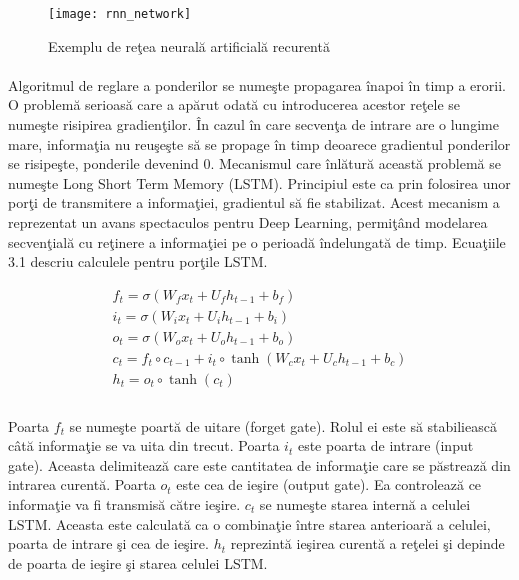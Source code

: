 \begin{figure}[H]
\centering
\texttt{[image: rnn\_network]}
\caption{Exemplu de re\c tea neural\u a artificial\u a recurent\u a}
\end{figure}

\paragraph{}
Algoritmul de reglare a ponderilor se nume\c ste propagarea \^ inapoi \^ in timp a erorii. O problem\u a serioas\u a care a ap\u arut odat\u a cu introducerea acestor re\c tele se nume\c ste risipirea gradien\c tilor. \^ In cazul \^ in care secven\c ta de intrare are o lungime mare, informa\c tia nu reu\c se\c ste s\u a se propage \^ in timp deoarece gradientul ponderilor se risipe\c ste, ponderile devenind 0. Mecanismul care \^ inl\u atur\u a aceast\u a problem\u a se nume\c ste Long Short Term Memory (LSTM). Principiul este ca prin folosirea unor por\c ti de transmitere a informa\c tiei, gradientul s\u a fie stabilizat. Acest mecanism a reprezentat un avans spectaculos pentru Deep Learning, permi\c t\^ and modelarea secven\c tial\u a cu re\c tinere a informa\c tiei pe o perioad\u a \^ indelungat\u a de timp. Ecua\c tiile 3.1 descriu calculele pentru por\c tile LSTM.

\begin{equation}
\begin{split}
f_{t} = \sigma(W_{f}x_{t} + U_{f}h_{t-1} + b_{f})\\
i_{t} = \sigma(W_{i}x_{t} + U_{i}h_{t-1} + b_{i})\\
o_{t} = \sigma(W_{o}x_{t} + U_{o}h_{t-1} + b_{o})\\
c_{t} = f_{t} \circ c_{t-1} + i_{t} \circ \tanh (W_{c}x_{t} + U_{c}h_{t-1} + b_{c})\\
h_{t} = o_{t} \circ \tanh (c_{t})\\
\end{split}
\end{equation}

\paragraph{}
Poarta \(f_{t}\) se nume\c ste poart\u a de uitare (forget gate). Rolul ei este s\u a stabilieasc\u a c\^ at\u a informa\c tie se va uita din trecut. Poarta \(i_{t}\) este poarta de intrare (input gate). Aceasta delimiteaz\u a care este cantitatea de informa\c tie care se p\u astreaz\u a din intrarea curent\u a. Poarta \(o_{t}\) este cea de ie\c sire (output gate). Ea controleaz\u a ce informa\c tie va fi transmis\u a c\u atre ie\c sire. \(c_{t}\) se nume\c ste starea intern\u a a celulei LSTM. Aceasta este calculat\u a ca o combina\c tie \^ intre starea anterioar\u a a celulei, poarta de intrare \c si cea de ie\c sire. \(h_{t}\) reprezint\u a ie\c sirea curent\u a a re\c telei \c si depinde de poarta de ie\c sire \c si starea celulei LSTM. 

